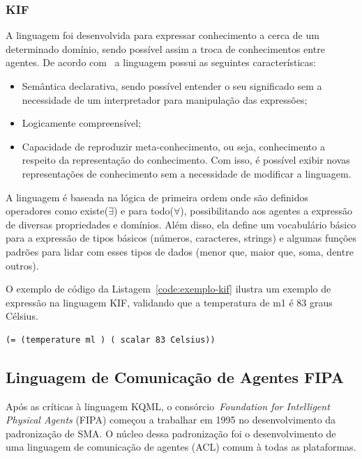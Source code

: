 \subsubsection{KIF}
A linguagem foi desenvolvida para expressar conhecimento a cerca de um determinado domínio, sendo possível assim a troca de conhecimentos entre agentes. De acordo com~\cite{kifmanual} a linguagem possui as seguintes características:
\begin{itemize}
	\item Semântica declarativa, sendo possível entender o seu significado sem a necessidade de um interpretador para manipulação das expressões;
	\item Logicamente compreensível;
	\item Capacidade de reproduzir meta-conhecimento, ou seja, conhecimento a respeito da representação do conhecimento. Com isso, é possível exibir novas representações de conhecimento sem a necessidade de modificar a linguagem.
\end{itemize}

A linguagem é baseada na lógica de primeira ordem onde são definidos operadores como existe($\exists$) e para todo($\forall$), possibilitando aos agentes a expressão de diversas propriedades e domínios. Além disso, ela define um vocabulário básico para a expressão de tipos básicos (números, caracteres, strings) e algumas funções padrões para lidar com esses tipos de dados (menor que, maior que, soma, dentre outros). 

O exemplo de código da Listagem~\ref{code:exemplo-kif} ilustra um exemplo de expressão na linguagem KIF, validando que a temperatura de m1 é 83 graus Célsius.

\begin{lstlisting}[label=code:exemplo-kif,caption=Exemplo de expressão de conteúdo com a linguagem KIF. Fonte:~\cite{wooldridge04}]
(= (temperature ml ) ( scalar 83 Celsius))
\end{lstlisting}

\subsection{Linguagem de Comunicação de Agentes FIPA}

Após as críticas à linguagem KQML, o consórcio~\emph{Foundation for Intelligent Physical Agents} (FIPA) começou a trabalhar em 1995 no desenvolvimento da padronização de SMA. O núcleo dessa padronização foi o desenvolvimento de uma linguagem de comunicação de agentes (ACL) comum à todas as plataformas.

